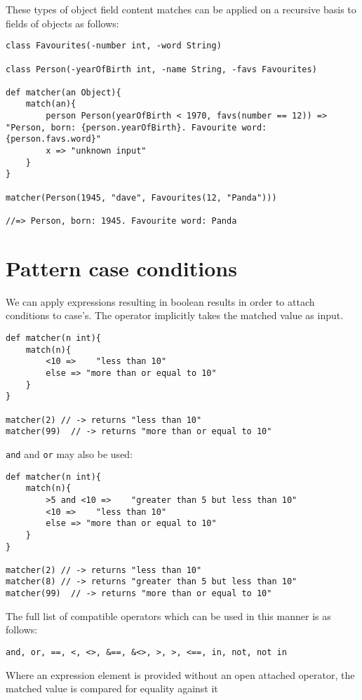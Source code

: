 \documentclass[conc-doc]{subfiles}
\begin{document}
These types of object field content matches can be applied on a recursive basis to fields of objects as follows:
\begin{lstlisting}
class Favourites(-number int, -word String)

class Person(-yearOfBirth int, -name String, -favs Favourites)

def matcher(an Object){
	match(an){
		person Person(yearOfBirth < 1970, favs(number == 12)) => "Person, born: {person.yearOfBirth}. Favourite word: {person.favs.word}"
		x => "unknown input"
	}
}

matcher(Person(1945, "dave", Favourites(12, "Panda")))

//=> Person, born: 1945. Favourite word: Panda
\end{lstlisting}

\section{Pattern case conditions}
We can apply expressions resulting in boolean results in order to attach conditions to case's. The operator implicitly takes the matched value as input.

\begin{lstlisting}
def matcher(n int){
	match(n){
		<10 =>    "less than 10" 
		else => "more than or equal to 10" 
	}
}

matcher(2) // -> returns "less than 10"
matcher(99)  // -> returns "more than or equal to 10"
\end{lstlisting}

\lstinline{and} and \lstinline{or} may also be used:

\begin{lstlisting}
def matcher(n int){
	match(n){
		>5 and <10 =>    "greater than 5 but less than 10" 
		<10 =>    "less than 10" 
		else => "more than or equal to 10" 
	}
}

matcher(2) // -> returns "less than 10"
matcher(8) // -> returns "greater than 5 but less than 10"
matcher(99)  // -> returns "more than or equal to 10"
\end{lstlisting}

The full list of compatible operators which can be used in this manner is as follows:

\lstinline{and, or, ==, <, <>, &==, &<>, >, >, <==, in, not, not in}

Where an expression element is provided without an open attached operator, the matched value is compared for equality against it
\end{document}
